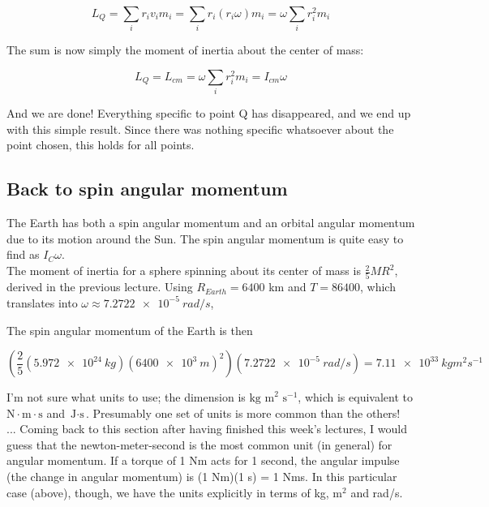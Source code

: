 \documentclass[8.01x]{subfiles}
\begin{document}
\begin{equation}
L_Q = \sum_i r_i v_i m_i = \sum_i r_i (r_i \omega) m_i = \omega \sum_i r_i^2 m_i
\end{equation}

The sum is now simply the moment of inertia about the center of mass:

\begin{equation}
L_Q = L_{cm} = \omega \sum_i r_i^2 m_i = I_{cm} \omega
\end{equation}

And we are done! Everything specific to point Q has disappeared, and we end up with this simple result. Since there was nothing specific whatsoever about the point chosen, this holds for all points.

\subsection{Back to spin angular momentum}

The Earth has both a spin angular momentum and an orbital angular momentum due to its motion around the Sun. The spin angular momentum is quite easy to find as $I_C \omega$.\\
The moment of inertia for a sphere spinning about its center of mass is $\displaystyle \frac{2}{5} M R^2$, derived in the previous lecture. Using $R_{Earth} = 6400$ km and $T = 86400$, which translates into $\omega \approx \SI{7.2722e-5}{rad/s}$, 

The spin angular momentum of the Earth is then

\begin{equation}
\left(\frac{2}{5} (\SI{5.972e24}{kg}) (\SI{6400e3}{m})^2\right) (\SI{7.2722e-5}{rad/s}) = \SI{7.11e33}{kg m^2 s^{-1}}
\end{equation}

I'm not sure what units to use; the dimension is $\text{kg m}^2 \text{ s}^{-1}$, which is equivalent to $\text{N}\cdot\text{m} \cdot \text{s}$ and $\text{J} \cdot \text{s}$. Presumably one set of units is more common than the others!\\
... Coming back to this section after having finished this week's lectures, I would guess that the newton-meter-second is the most common unit (in general) for angular momentum. If a torque of 1 Nm acts for 1 second, the angular impulse (the change in angular momentum) is (1 Nm)(1 s) = 1 Nms. In this particular case (above), though, we have the units explicitly in terms of kg, $\text{m}^2$ and rad/s.
\end{document}
